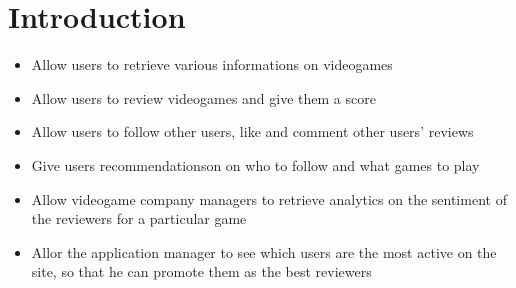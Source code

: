\chapter{Introduction}
\begin{itemize}
	\item Allow users to retrieve various informations on videogames
	\item Allow users to review videogames and give them a score 
	\item Allow users to follow other users, like and comment other users' reviews
	\item Give users recommendationson on who to follow and what games to play
	\item Allow videogame company managers to retrieve analytics on the sentiment of the reviewers for a particular game 
	\item Allor the application manager to see which users are the most active on the site, so that he can promote them as the best reviewers 
\end{itemize}

